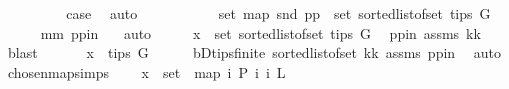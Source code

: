 \begin{isabellebody}
\ \ \ \ \ \ \isamarkupfalse%
\ \isamarkupfalse%
\ {\isacharquery}{\kern0pt}case\ \isamarkupfalse%
\ auto\isanewline
\ \ \ \ \isamarkupfalse%
\isanewline
\ \ \isamarkupfalse%
\isanewline
\ \ \isamarkupfalse%
\ {\isachardoublequoteopen}set\ {\isacharparenleft}{\kern0pt}map\ snd\ pp{\isacharparenright}{\kern0pt}\ {\isacharequal}{\kern0pt}\ set\ {\isacharparenleft}{\kern0pt}sorted{\isacharunderscore}{\kern0pt}list{\isacharunderscore}{\kern0pt}of{\isacharunderscore}{\kern0pt}set\ {\isacharparenleft}{\kern0pt}tips\ G{\isacharparenright}{\kern0pt}{\isacharparenright}{\kern0pt}{\isachardoublequoteclose}\ \isanewline
\ \ \ \ \isamarkupfalse%
\ mm{}\ pp{\isacharunderscore}{\kern0pt}in\ \ \isamarkupfalse%
\ auto\isanewline
\ \ \isamarkupfalse%
\ \isamarkupfalse%
\ {\isachardoublequoteopen}x\ {\isasymin}\ set\ {\isacharparenleft}{\kern0pt}sorted{\isacharunderscore}{\kern0pt}list{\isacharunderscore}{\kern0pt}of{\isacharunderscore}{\kern0pt}set\ {\isacharparenleft}{\kern0pt}tips\ G{\isacharparenright}{\kern0pt}{\isacharparenright}{\kern0pt}{\isachardoublequoteclose}\ \isamarkupfalse%
\ pp{\isacharunderscore}{\kern0pt}in\ assms{\isacharparenleft}{\kern0pt}{}{\isacharparenright}{\kern0pt}\ kk\ \isamarkupfalse%
\ blast\ \isanewline
\ \ \isamarkupfalse%
\ \isamarkupfalse%
\ {\isachardoublequoteopen}x\ {\isasymin}\ tips\ G{\isachardoublequoteclose}\isanewline
\ \ \ \ \isamarkupfalse%
\ bD{\isachardot}{\kern0pt}tips{\isacharunderscore}{\kern0pt}finite\ sorted{\isacharunderscore}{\kern0pt}list{\isacharunderscore}{\kern0pt}of{\isacharunderscore}{\kern0pt}set{\isacharparenleft}{\kern0pt}{}{\isacharparenright}{\kern0pt}\ kk\ assms\ pp{\isacharunderscore}{\kern0pt}in\ \isamarkupfalse%
\ auto\isanewline
{}\isamarkupfalse%
%
\endisatagproof
{\isafoldproof}%
%
\isadelimproof
\isanewline
%
\endisadelimproof
\isanewline
\isanewline
{}\isamarkupfalse%
\ chosen{\isacharunderscore}{\kern0pt}map{\isacharunderscore}{\kern0pt}simps{}{\isacharcolon}{\kern0pt}\isanewline
\ \ \ {\isachardoublequoteopen}\ x\ {\isasymin}\ set\ \ {\isacharparenleft}{\kern0pt}map\ {\isacharparenleft}{\kern0pt}{\isasymlambda}i{\isachardot}{\kern0pt}\ {\isacharparenleft}{\kern0pt}P\ i{\isacharcomma}{\kern0pt}\ i{\isacharparenright}{\kern0pt}{\isacharparenright}{\kern0pt}\ L{\isacharparenright}{\kern0pt}{\isachardoublequoteclose}\isanewline

\end{isabellebody}
